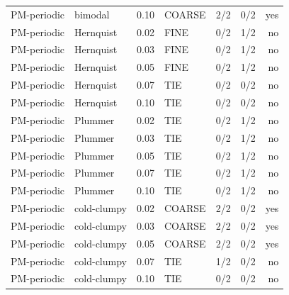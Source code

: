 \begin{tabular}{llllrrr}
PM-periodic & bimodal & 0.10 & COARSE & 2/2 & 0/2 & yes\\
PM-periodic & Hernquist & 0.02 & FINE & 0/2 & 1/2 & no\\
PM-periodic & Hernquist & 0.03 & FINE & 0/2 & 1/2 & no\\
PM-periodic & Hernquist & 0.05 & FINE & 0/2 & 1/2 & no\\
PM-periodic & Hernquist & 0.07 & TIE & 0/2 & 0/2 & no\\
PM-periodic & Hernquist & 0.10 & TIE & 0/2 & 0/2 & no\\
PM-periodic & Plummer & 0.02 & TIE & 0/2 & 1/2 & no\\
PM-periodic & Plummer & 0.03 & TIE & 0/2 & 1/2 & no\\
PM-periodic & Plummer & 0.05 & TIE & 0/2 & 1/2 & no\\
PM-periodic & Plummer & 0.07 & TIE & 0/2 & 1/2 & no\\
PM-periodic & Plummer & 0.10 & TIE & 0/2 & 1/2 & no\\
PM-periodic & cold-clumpy & 0.02 & COARSE & 2/2 & 0/2 & yes\\
PM-periodic & cold-clumpy & 0.03 & COARSE & 2/2 & 0/2 & yes\\
PM-periodic & cold-clumpy & 0.05 & COARSE & 2/2 & 0/2 & yes\\
PM-periodic & cold-clumpy & 0.07 & TIE & 1/2 & 0/2 & no\\
PM-periodic & cold-clumpy & 0.10 & TIE & 0/2 & 0/2 & no\\
\bottomrule
\end{tabular}
